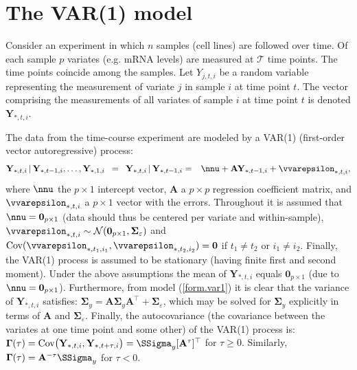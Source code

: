\section{The VAR(1) model}
Consider an experiment in which $n$ samples (cell lines) are followed over time. Of each sample $p$ variates (e.g. mRNA levels) are measured at $\mathcal{T}$ time points. The time points coincide among the samples. Let $Y_{j,t,i}$ be a random variable representing the measurement of variate $j$ in sample $i$ at time point $t$. The vector comprising the measurements of all variates of sample $i$ at time point $t$ is denoted $\mathbf{Y}_{\ast,t,i}$.

The data from the time-course experiment are modeled by a VAR(1) (first-order vector autoregressive) process:
\begin{eqnarray} \label{form.var1}
\mathbf{Y}_{\ast, t, i} \, | \, \mathbf{Y}_{\ast, t-1, i}, \ldots,  \mathbf{Y}_{\ast, 1, i}
\, \, \, = \, \, \, \mathbf{Y}_{\ast, t, i} \, | \, \mathbf{Y}_{\ast, t-1, i} & = & \nnu + \mathbf{A} \mathbf{Y}_{\ast, t-1, i} + \vvarepsilon_{\ast, t, i},
\end{eqnarray}
where $\nnu$ the $p \times 1$ intercept vector, $\mathbf{A}$ a $p \times p$ regression coefficient matrix, and $\vvarepsilon_{\ast, t, i}$ a $p \times 1$ vector with the errors. Throughout it is assumed that $\nnu = \mathbf{0}_{p \times 1}$ (data should thus be centered per variate and within-sample), $\vvarepsilon_{\ast,t,i} \sim \mathcal{N}(\mathbf{0}_{p \times 1}, \mathbf{\Sigma}_{\varepsilon})$ and $\mbox{Cov}(\vvarepsilon_{\ast,t_1,i_1}, \vvarepsilon_{\ast,t_2, i_2}) = \mathbf{0}$ if $t_1 \not=t_2$ or $i_1 \not=i_2$. Finally, the VAR(1) process is assumed to be stationary (having finite first and second moment). Under the above assumptions the mean of $\mathbf{Y}_{\ast,t,i}$ equals $\mathbf{0}_{p \times 1}$ (due to $\nnu = \mathbf{0}_{p \times 1}$). Furthermore, from model (\ref{form.var1}) it is clear that the variance of $\mathbf{Y}_{\ast,t,i}$ satisfies: $\mathbf{\Sigma}_{y}  =  \mathbf{A} \mathbf{\Sigma}_{y} \mathbf{A}^{\top} + \mathbf{\Sigma}_{\varepsilon}$, which may be solved for $\mathbf{\Sigma}_y$ explicitly in terms of $\mathbf{A}$ and $\mathbf{\Sigma}_{\varepsilon}$. Finally, the autocovariance (the covariance between the variates at one time point and some other) of the VAR(1) process is: $\mathbf{\Gamma}(\tau)  =  \mbox{Cov} \big( \mathbf{Y}_{\ast,t,i}, \mathbf{Y}_{\ast,t+\tau,i} \big) = \SSigma_y [\mathbf{A}^{\tau}]^{\top}$ for $\tau \geq 0$. Similarly, $\mathbf{\Gamma}(\tau)  = \mathbf{A}^{-\tau} \SSigma_y$ for $\tau < 0$.

